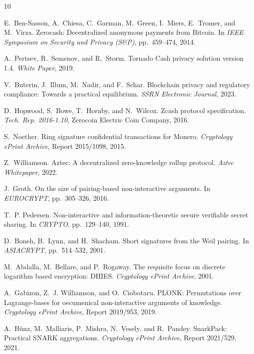 \documentclass[sigconf,nonacm]{acmart}
\begin{document}

\begin{thebibliography}{10}

E.~Ben-Sasson, A.~Chiesa, C.~Garman, M.~Green, I.~Miers, E.~Tromer, and M.~Virza.
\newblock Zerocash: Decentralized anonymous payments from Bitcoin.
\newblock In \emph{IEEE Symposium on Security and Privacy (S\&P)}, pp.~459--474, 2014.

A.~Pertsev, R.~Semenov, and R.~Storm.
\newblock Tornado Cash privacy solution version 1.4.
\newblock \emph{White Paper}, 2019.

V.~Buterin, J.~Illum, M.~Nadir, and F.~Schar.
\newblock Blockchain privacy and regulatory compliance: Towards a practical equilibrium.
\newblock \emph{SSRN Electronic Journal}, 2023.

D.~Hopwood, S.~Bowe, T.~Hornby, and N.~Wilcox.
\newblock Zcash protocol specification.
\newblock \emph{Tech. Rep. 2016-1.10}, Zerocoin Electric Coin Company, 2016.

S.~Noether.
\newblock Ring signature confidential transactions for Monero.
\newblock \emph{Cryptology ePrint Archive}, Report 2015/1098, 2015.

Z.~Williamson.
\newblock Aztec: A decentralized zero-knowledge rollup protocol.
\newblock \emph{Aztec Whitepaper}, 2022.

J.~Groth.
\newblock On the size of pairing-based non-interactive arguments.
\newblock In \emph{EUROCRYPT}, pp.~305--326, 2016.

T.~P. Pedersen.
\newblock Non-interactive and information-theoretic secure verifiable secret sharing.
\newblock In \emph{CRYPTO}, pp.~129--140, 1991.

D.~Boneh, B.~Lynn, and H.~Shacham.
\newblock Short signatures from the Weil pairing.
\newblock In \emph{ASIACRYPT}, pp.~514--532, 2001.

M.~Abdalla, M.~Bellare, and P.~Rogaway.
\newblock The requisite focus on discrete logarithm based encryption: DHIES.
\newblock \emph{Cryptology ePrint Archive}, 2001.

A.~Gabizon, Z.~J. Williamson, and O.~Ciobotaru.
\newblock PLONK: Permutations over Lagrange-bases for oecumenical non-interactive arguments of knowledge.
\newblock \emph{Cryptology ePrint Archive}, Report 2019/953, 2019.

A.~B{\"u}nz, M.~Malliaris, P.~Mishra, N.~Vesely, and R.~Pandey.
\newblock SnarkPack: Practical SNARK aggregations.
\newblock \emph{Cryptology ePrint Archive}, Report 2021/529, 2021.

\end{thebibliography}
\end{document}
